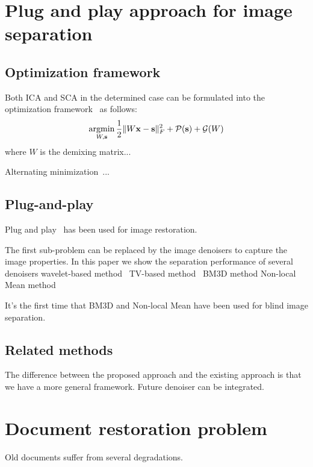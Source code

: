\documentclass[conference]{IEEEtran}
\newcommand{\argmin}{\mathop{\mathrm{argmin}}}
\theoremstyle{plain}
\begin{document}
\section{Plug and play approach for image separation}
\label{sec: plug and play}

\subsection{Optimization framework}
Both ICA and SCA in the determined case can be formulated into the optimization framework~\cite{feng2018revisiting} as follows:
\begin{equation}
\label{eq: optimization framework}
\argmin_{W, \bs} \frac{1}{2} \|W\bx - \bs\|_F^2 + \mathcal{P}(\bs) + \mathcal{G}(W)
\end{equation}
where $W$ is the demixing matrix... 




Alternating minimization~\cite{tseng2001convergence}...


\subsection{Plug-and-play}
Plug and play~\cite{venkatakrishnan2013plug,chan2016plug,ono2017primal} has been used for image restoration.

The first sub-problem can be replaced by the image denoisers to capture the image properties. In this paper we show the separation performance of several denoisers
wavelet-based method~\cite{donoho1994ideal,chang2000adaptive}
TV-based method~\cite{chambolle2004algorithm}
BM3D method
Non-local Mean method

It's the first time that BM3D and Non-local Mean have been used for blind image separation.

\subsection{Related methods}

The difference between the proposed approach and the existing approach is that we have a more general framework. Future denoiser can be integrated.

\section{Document restoration problem}
\label{sec: document restoration}
Old documents suffer from several degradations. 
\end{document}
